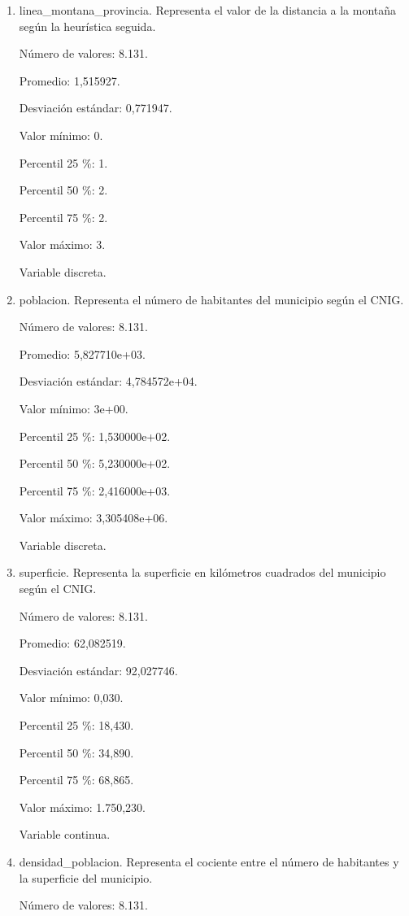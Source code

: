 \begin{enumerate}
	\item linea\_montana\_provincia. Representa el valor de la distancia a la montaña según la heurística seguida.
	
	Número de valores: 8.131.
	
	Promedio: 1,515927.
	
	Desviación estándar: 0,771947.
	
	Valor mínimo: 0.
	
	Percentil 25 \%: 1.
	
	Percentil 50 \%: 2.
	
	Percentil 75 \%: 2.
	
	Valor máximo: 3.
	
	Variable discreta.

	\item poblacion. Representa el número de habitantes del municipio según el CNIG.
	
	Número de valores: 8.131.
	
	Promedio: 5,827710e+03.
	
	Desviación estándar: 4,784572e+04.
	
	Valor mínimo: 3e+00.
	
	Percentil 25 \%: 1,530000e+02.
	
	Percentil 50 \%: 5,230000e+02.
	
	Percentil 75 \%: 2,416000e+03.
	
	Valor máximo: 3,305408e+06.
	
	Variable discreta.

	\item superficie. Representa la superficie en kilómetros cuadrados del municipio según el CNIG.
	
	Número de valores: 8.131.
	
	Promedio: 62,082519.
	
	Desviación estándar: 92,027746.
	
	Valor mínimo: 0,030.
	
	Percentil 25 \%: 18,430.
	
	Percentil 50 \%: 34,890.
	
	Percentil 75 \%: 68,865.
	
	Valor máximo: 1.750,230.
	
	Variable continua.

	\item densidad\_poblacion. Representa el cociente entre el número de habitantes y la superficie del municipio.
	
	Número de valores: 8.131.
	

\end{enumerate}
